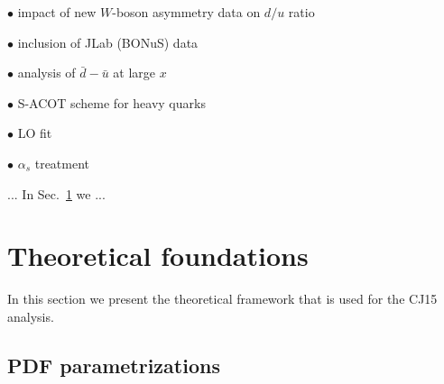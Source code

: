 \documentclass[aps,prd,amsmath,preprint]{revtex4}
\begin{document}
$\bullet$
impact of new $W$-boson asymmetry data on $d/u$ ratio

$\bullet$
inclusion of JLab (BONuS) data

$\bullet$
analysis of $\bar d - \bar u$ at large $x$

$\bullet$
S-ACOT scheme for heavy quarks

$\bullet$
LO fit

$\bullet$
$\alpha_s$ treatment



... In Sec.~\ref{sec:thy} we ...




\section{Theoretical foundations}
\label{sec:thy}

In this section we present the theoretical framework that is used for
the CJ15 analysis.


\subsection{PDF parametrizations}
\label{ssec:parametrizations}
\end{document}
